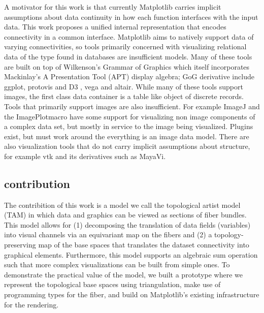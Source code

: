 \documentclass[../main.tex]{subfiles}
\begin{document}
A motivator for this work is that currently Matplotlib carries implicit assumptions about data continuity in how each function interfaces with the input data. This work proposes a unified internal representation that encodes connectivity in a common interface. Matplotlib aims to natively support data of varying connectivities, so tools primarily concerned with visualizing relational data of the type found in databases are insufficient models. Many of these tools are built on top of Wilkenson's Grammar of Graphics \cite{wilkinsonGrammarGraphics2005} which itself incorporates Mackinlay's  A Presentation Tool (APT) display algebra; GoG derivative include ggplot\cite{wickhamGgplot2ElegantGraphics2016a}, protovis\cite{bostockProtoviz2009} and D3 \cite{bostockDataDrivenDocuments2011}, vega\cite{satyanarayanDeclarativeInteractionDesign2014} and altair\cite{vanderplasAltairInteractiveStatistical2018}. While many of these tools support images, the first class data container is a table like object of discrete records. Tools that primarily support images are also insufficient. For example ImageJ\cite{schneiderNIHImageImageJ2012} and the ImagePlot\cite{studiesCulturevisImageplot2021}macro have some support for visualizing non image components of a complex data set, but mostly in service to the image being visualized. Plugins exist, but must work around the everything is an image data model\cite{WritingPlugins}. There are also visualization tools that do not carry implicit assumptions about structure, for example vtk\cite{hanwellVisualizationToolkitVTK2015,geveci2012vtk} and its derivatives such as MayaVi\cite{ramachandranMayaVi2011}. 


\subsection{contribution}
The contribition of this work is a model we call the topological artist model (TAM) in which data and graphics can be viewed as sections of fiber bundles. This model allows for (1) decomposing the translation of data fields (variables) into visual channels via an equivariant map on the fibers and (2) a topology-preserving map of the base spaces that translates the dataset connectivity into graphical elements. Furthermore, this model supports an algebraic sum operation such that more complex visualizations can be built from simple ones. To demonstrate the practical value of the model, we built a prototype where we represent the topological base spaces using triangulation, make use of programming types for the fiber, and build on Matplotlib's existing infrastructure for the rendering. 
\end{document}
